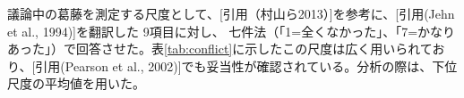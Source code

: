 \documentclass[11pt, a4paper]{jreport} %
\begin{document}

議論中の葛藤を測定する尺度として、[引用（村山ら2013）]を参考に、[引用(Jehn et al., 1994)]を翻訳した
9項目に対し、
七件法（「1=全くなかった」、「7=かなりあった」）で回答させた。表\ref{tab:conflict}に示したこの尺度は広く用いられており、[引用(Pearson et al., 2002)]でも妥当性が確認されている。分析の際は、下位尺度の平均値を用いた。
\end{document}
